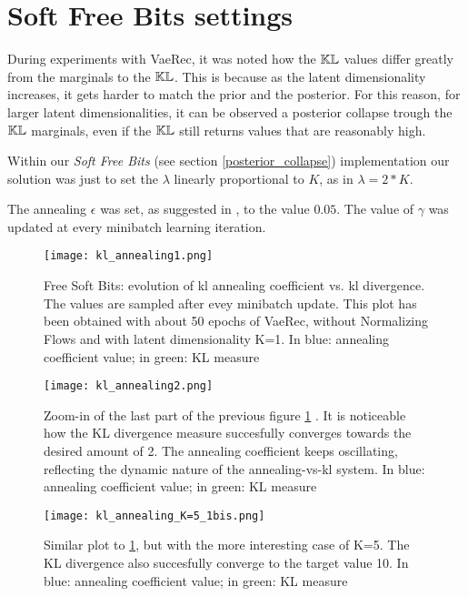\section{Soft Free Bits settings}

During experiments with VaeRec, it was noted how the $\mathbb{KL}$ values differ greatly from
the marginals to the $\mathbb{KL}$.
This is because as the latent dimensionality increases, it gets harder to match
the prior and the posterior.
For this reason, for larger latent dimensionalities,
it can be observed a posterior collapse trough the $\mathbb{KL}$ marginals,
even if the $\mathbb{KL}$ still returns values that are reasonably high.

Within our \emph{Soft Free Bits} (see section \ref{posterior_collapse}) implementation
our solution was just to set the $\lambda$ linearly proportional to $K$, as in $\lambda=2*K$.

The annealing $\epsilon$ was set, as suggested in \cite{1611.02731}, to the value $0.05$.
The value of $\gamma$ was updated at every minibatch learning iteration.

\begin{figure}[H]
\centering
\texttt{[image: kl\_annealing1.png]}
\caption{Free Soft Bits: evolution of kl annealing coefficient vs. kl divergence. The values are sampled after evey minibatch update. This plot has been obtained with about 50 epochs of VaeRec, without Normalizing Flows and with latent dimensionality K=1. In blue: annealing coefficient value; in green: KL measure}
\label{kl_annealing1}
\end{figure}


\begin{figure}[H]
\centering
\texttt{[image: kl\_annealing2.png]}
\caption{Zoom-in of the last part of the previous figure \ref{kl_annealing1} . It is noticeable how the KL divergence measure succesfully converges towards the desired amount of 2. The annealing coefficient keeps oscillating, reflecting the dynamic nature of the annealing-vs-kl system. In blue: annealing coefficient value; in green: KL measure}
\label{kl_annealing2}
\end{figure}

\begin{figure}[H]
\centering
\texttt{[image: kl\_annealing\_K=5\_1bis.png]}
\caption{Similar plot to \ref{kl_annealing1}, but with the more interesting case of K=5. The KL divergence also succesfully converge to the target value 10. In blue: annealing coefficient value; in green: KL measure}
\label{kl_annealing_K5_1}
\end{figure}

